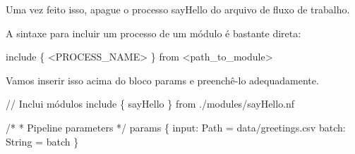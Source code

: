 \documentclass[
  brazilian,
  letterpaper,
  DIV=11,
  numbers=noendperiod]{scrreprt}
\newenvironment{Shaded}{\begin{snugshade}}{\end{snugshade}}
\newcommand{\BuiltInTok}[1]{\textcolor[rgb]{0.00,0.23,0.31}{#1}}
\newcommand{\CommentTok}[1]{\textcolor[rgb]{0.37,0.37,0.37}{#1}}
\newcommand{\NormalTok}[1]{\textcolor[rgb]{0.00,0.23,0.31}{#1}}
\newcommand{\OperatorTok}[1]{\textcolor[rgb]{0.37,0.37,0.37}{#1}}
\newcommand{\SpecialStringTok}[1]{\textcolor[rgb]{0.13,0.47,0.30}{#1}}
\newcommand{\StringTok}[1]{\textcolor[rgb]{0.13,0.47,0.30}{#1}}
\begin{document}
\begin{Shaded}
\end{Shaded}

Uma vez feito isso, apague o processo sayHello do arquivo de fluxo de
trabalho.

A sintaxe para incluir um processo de um módulo é bastante direta:

\begin{Shaded}
\begin{Highlighting}[]
\NormalTok{include }\OperatorTok{\{} \OperatorTok{\textless{}}\NormalTok{PROCESS\_NAME}\OperatorTok{\textgreater{}} \OperatorTok{\}}\NormalTok{ from }\StringTok{\textquotesingle{}\textless{}path\_to\_module\textgreater{}\textquotesingle{}}
\end{Highlighting}
\end{Shaded}

Vamos inserir isso acima do bloco params e preenchê-lo adequadamente.

\begin{Shaded}
\begin{Highlighting}[]
\CommentTok{// Inclui módulos}
\NormalTok{include }\OperatorTok{\{}\NormalTok{ sayHello }\OperatorTok{\}}\NormalTok{ from }\StringTok{\textquotesingle{}./modules/sayHello.nf\textquotesingle{}}

\CommentTok{/*}
\CommentTok{* Pipeline parameters}
\CommentTok{*/}
\NormalTok{params }\OperatorTok{\{}
\NormalTok{    input}\OperatorTok{:}\NormalTok{ Path }\OperatorTok{=} \StringTok{\textquotesingle{}data/greetings.csv\textquotesingle{}}
\NormalTok{    batch}\OperatorTok{:} \BuiltInTok{String} \OperatorTok{=} \StringTok{\textquotesingle{}batch\textquotesingle{}}
\OperatorTok{\}}
\end{Highlighting}
\end{Shaded}
\end{document}
